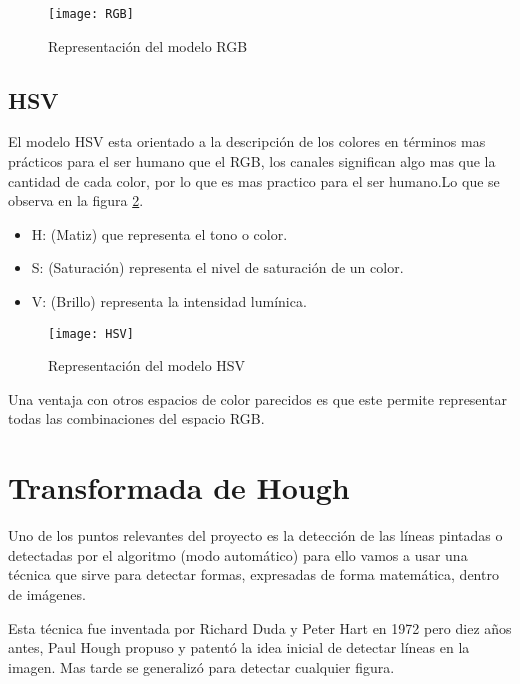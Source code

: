 \begin{figure}[h]
\centering
\texttt{[image: RGB]}
\caption{Representación del modelo RGB\cite{Manual:HAE}}
\label{fig:3.3}
\end{figure}

\subsection{HSV}
El modelo HSV \cite{modelo:hsv} esta orientado a la descripción de los colores en términos mas prácticos para el ser humano que el RGB, los canales significan algo mas que la cantidad de cada color, por lo que es mas practico para el ser humano.Lo que se observa en la figura \ref{fig:3.4}.
 
\begin{itemize}
	\item H: (Matiz) que representa el tono o color.\\
	\item S: (Saturación) representa el nivel de saturación de un color.\\
	\item V: (Brillo) representa la intensidad lumínica.\\
\end{itemize}

\begin{figure}[h]
\centering
\texttt{[image: HSV]}
\caption{Representación del modelo HSV\cite{Manual:HAE}}
\label{fig:3.4}
\end{figure}

Una ventaja con otros espacios de color parecidos es que este permite representar todas las combinaciones del espacio RGB.

\section{Transformada de Hough }

Uno de los puntos relevantes del proyecto es la detección de las líneas pintadas o detectadas por el algoritmo (modo automático) para ello vamos a usar una técnica que sirve para detectar formas, expresadas de forma matemática, dentro de imágenes.

Esta técnica fue inventada por Richard Duda y Peter Hart en 1972 pero diez años antes, Paul Hough propuso y patentó \cite{pat:patHough} la idea inicial de detectar líneas en la imagen. Mas tarde se generalizó para detectar cualquier figura.

